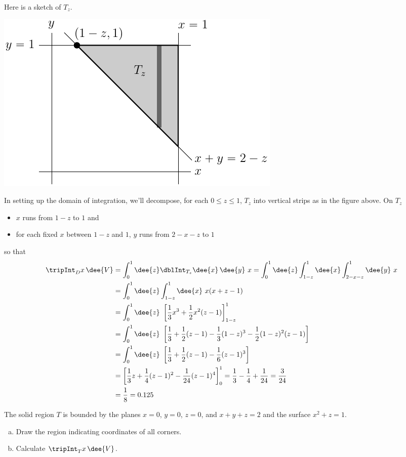 \begin{solution}
Here is a sketch of $T_z$.
\begin{center}
     \includegraphics{fig/OE01DQ8.pdf}
\end{center}
In setting up the domain of integration, we'll decompose, for each 
$0\le z\le   1$, $T_z$ into vertical strips as in the figure above.
On $T_z$
\begin{itemize}
\item
$x$ runs from $1-z$ to $1$ and
\item
for each fixed $x$ between $1-z$ and $1$, $y$ runs from $2-x-z$ to $1$
\end{itemize}
so that
\begin{align*}
\tripInt_D x\,\dee{V}
&=\int_0^1\dee{z}\dblInt_{T_z}\dee{x}\,\dee{y}\ x
=\int_0^1 \dee{z}\int_{1-z}^1 \dee{x}\int_{2-x-z}^1 \dee{y}\ x \\
&=\int_0^1 \dee{z}\int_{1-z}^1 \dee{x}\ x(x+z-1)\\
&=\int_0^1 \dee{z}\ \left[\frac{1}{3}x^3+\frac{1}{2} x^2(z-1)\right]_{1-z}^1\\
&=\int_0^1 \dee{z}\ \left[\frac{1}{3}+\frac{1}{2} (z-1)-\frac{1}{3}(1-z)^3
-\frac{1}{2}(1-z)^2(z-1)\right]\\
&=\int_0^1 \dee{z}\ \left[\frac{1}{3}+\frac{1}{2} (z-1)
                               -\frac{1}{6}(z-1)^3\right]\\
&=\left[\frac{1}{3}z+\frac{1}{4} (z-1)^2-\frac{1}{24}(z-1)^4\right]_0^1
=\frac{1}{3}-\frac{1}{4}+\frac{1}{24}=\frac{3}{24} \\
&=\frac{1}{8}=0.125
\end{align*}
\end{solution}

\goodbreak
\begin{question} [M200 2001A] %
The solid region $T$ is bounded by the planes $x=0$, $y=0$, 
$z=0$, and $x+y+z=2$ and the surface $x^2+z=1$.
\begin{enumerate}[(a)]
\item
Draw the region indicating coordinates of all corners.

\item
Calculate $\tripInt_T x\,\dee{V}$.
\end{enumerate}
\end{question}

